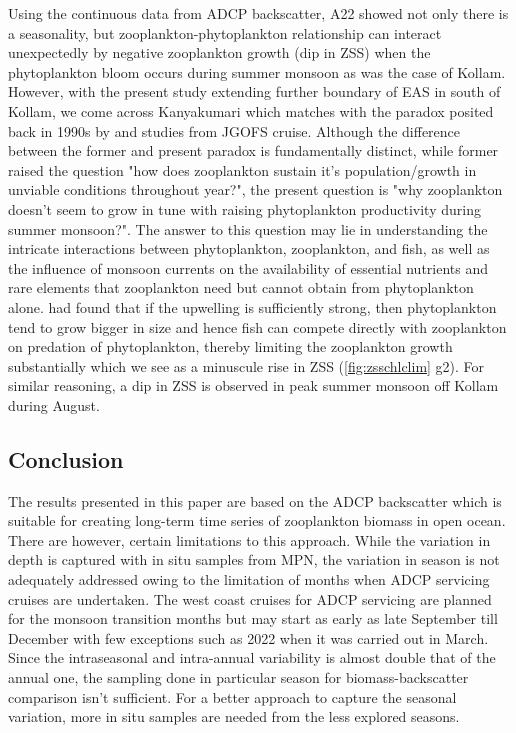 \documentclass{article}
\begin{document}
	Using the continuous data from ADCP backscatter, A22 showed not only there is a seasonality, but zooplankton-phytoplankton relationship can interact unexpectedly by negative zooplankton growth (dip in ZSS) when the phytoplankton bloom occurs during summer monsoon as was the case of Kollam. However, with the present study extending further boundary of EAS in south of Kollam, we come across Kanyakumari which matches with the paradox posited back in 1990s by \citet{madhupratap1992zooplankton, madhupratap1996lack, smith2005mesozooplankton} and studies from JGOFS cruise. Although the difference between the former and present paradox is fundamentally distinct, while former raised the question "how does zooplankton sustain it's population/growth in unviable conditions throughout year?", the present question is "why zooplankton doesn't seem to grow in tune with raising phytoplankton productivity during summer monsoon?". The answer to this question may lie in understanding the intricate interactions between phytoplankton, zooplankton, and fish, as well as the influence of monsoon currents on the availability of essential nutrients and rare elements that zooplankton need but cannot obtain from phytoplankton alone. \citep{shankar2019role} had found that if the upwelling is sufficiently strong, then phytoplankton tend to grow bigger in size and hence fish can compete directly with zooplankton on predation of phytoplankton, thereby limiting the zooplankton growth substantially which we see as a minuscule rise in ZSS (\cref{fig:zsschlclim} g2). For similar reasoning, a dip in ZSS is observed in peak summer monsoon off Kollam during August.

	\subsection{Conclusion}
	The results presented in this paper are based on the ADCP backscatter which is suitable for creating long-term time series of zooplankton biomass in open ocean. There are however, certain limitations to this approach. While the variation in depth is captured with in situ samples from MPN, the variation in season is not adequately addressed owing to the limitation of months when ADCP servicing cruises are undertaken. The west coast  cruises for ADCP servicing are planned for the monsoon transition months but may start as early as late September till December with few exceptions such as 2022 when it was carried out in March. Since the intraseasonal and intra-annual variability is almost double that of the annual one, the sampling done in particular season for biomass-backscatter comparison isn't sufficient. For a better approach to capture the  seasonal variation, more in situ samples are needed from the less explored seasons. 
	
\end{document}
